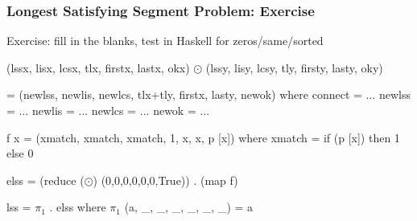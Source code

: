 \documentclass{beamer}
\renewcommand{\emph}[1]{\textcolor{structure}{#1}}
\newcommand{\emp}[1]{\textcolor{DikuRed}{ #1}}
\newcommand{\mymath}[1]{$ #1 $}
\newcommand{\myindx}[1]{_{#1}}
\begin{document}
\begin{frame}[fragile,t]
  \frametitle{Longest Satisfying Segment Problem: Exercise}

\begin{block}{Exercise: fill in the blanks, test in Haskell for zeros/same/sorted}
\begin{colorcode}
(lssx, lisx, lcsx, tlx, firstx, lastx, okx) \mymath{\odot}
(lssy, lisy, lcsy, tly, firsty, lasty, oky) 

  = (newlss, newlis, newlcs, tlx+tly, firstx, lasty, newok)
     where
        connect = ...
        newlss  = ...
        newlis  = ... 
        newlcs  = ... 
        newok   = ...

f x = (xmatch, xmatch, xmatch, 1, x, x, p [x])
    where xmatch = if (p [x]) then 1 else 0

\emph{elss = (reduce (\mymath{\odot}) (0,0,0,0,0,0,True)) . (map f)}

\emp{lss  = \mymath{\pi\myindx{1}} . elss}
       where \mymath{\pi\myindx{1}} (a, _, _, _, _, _, _) = a         
\end{colorcode}
\end{block} 


\end{frame}



%
%
%
%
%
%
\end{document}
